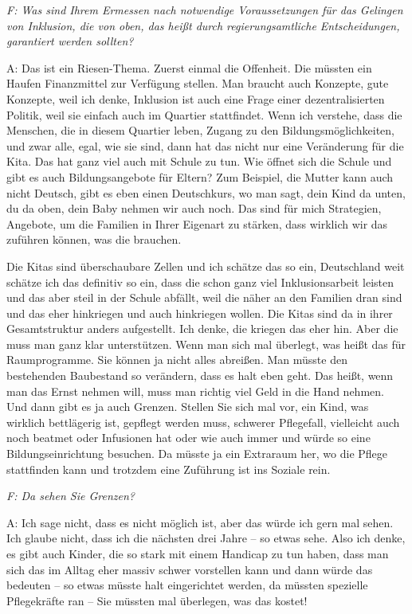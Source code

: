 \begin{linenumbers}
\emph{F: Was sind Ihrem Ermessen nach notwendige Voraussetzungen für das Gelingen von Inklusion, die von oben, das heißt durch regierungsamtliche Entscheidungen, garantiert werden sollten?}

A: Das ist ein Riesen-Thema. Zuerst einmal die Offenheit. Die müssten ein Haufen Finanzmittel zur Verfügung stellen. Man braucht auch Konzepte, gute Konzepte, weil ich denke, Inklusion ist auch eine Frage einer dezentralisierten Politik, weil sie einfach auch im Quartier stattfindet. Wenn ich verstehe, dass die Menschen, die in diesem Quartier leben, Zugang zu den Bildungsmöglichkeiten, und zwar alle, egal, wie sie sind, dann hat das nicht nur eine Veränderung für die Kita. Das hat ganz viel auch mit Schule zu tun. Wie öffnet sich die Schule und gibt es auch Bildungsangebote für Eltern? Zum Beispiel, die Mutter kann auch nicht Deutsch, gibt es eben einen Deutschkurs, wo man sagt, dein Kind da unten, du da oben, dein Baby nehmen wir auch noch. Das sind für mich Strategien, Angebote, um die Familien in Ihrer Eigenart zu stärken, dass wirklich wir das zuführen können, was die brauchen. 

Die Kitas sind überschaubare Zellen und ich schätze das so ein, Deutschland weit schätze ich das definitiv so ein, dass die schon ganz viel Inklusionsarbeit leisten und das aber steil in der Schule abfällt, weil die näher an den Familien dran sind und das eher hinkriegen und auch hinkriegen wollen. Die Kitas sind da in ihrer Gesamtstruktur anders aufgestellt. Ich denke, die kriegen das eher hin. Aber die muss man ganz klar unterstützen. Wenn man sich mal überlegt, was heißt das für Raumprogramme. Sie können ja nicht alles abreißen. Man müsste den bestehenden Baubestand so verändern, dass es halt eben geht. Das heißt, wenn man das Ernst nehmen will, muss man richtig viel Geld in die Hand nehmen.  
Und dann gibt es ja auch Grenzen. Stellen Sie sich mal vor, ein Kind, was wirklich bettlägerig ist, gepflegt werden muss, schwerer Pflegefall, vielleicht auch noch beatmet oder Infusionen hat oder wie auch immer und würde so eine Bildungseinrichtung besuchen. Da müsste ja ein Extraraum her, wo die Pflege stattfinden kann und trotzdem eine Zuführung ist ins Soziale rein. 

\emph{F: Da sehen Sie Grenzen?}

A: Ich sage nicht, dass es nicht möglich ist, aber das würde ich gern mal sehen. Ich glaube nicht, dass ich die nächsten drei Jahre -- so etwas sehe. Also ich denke, es gibt auch Kinder, die so stark mit einem Handicap zu tun haben, dass man sich das im Alltag eher massiv schwer vorstellen kann und dann würde das bedeuten -- so etwas müsste halt eingerichtet werden, da müssten spezielle Pflegekräfte ran -- Sie müssten mal überlegen, was das kostet! 


\end{linenumbers}
